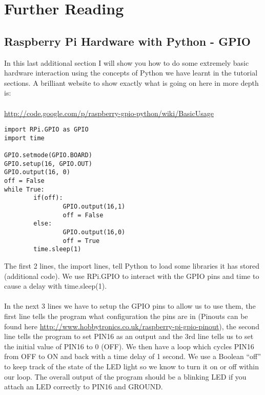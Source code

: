 \documentclass[twocolumn]{article}
\begin{document}
\section{Further Reading}

\subsection{Raspberry Pi Hardware with Python - GPIO}

In this last additional section I will show you how to do some extremely basic hardware interaction using the concepts of Python we have learnt in the tutorial sections. A brilliant website to show exactly what is going on here in more depth is:\\
\\ \url{http://code.google.com/p/raspberry-gpio-python/wiki/BasicUsage}
\begin{lstlisting}
import RPi.GPIO as GPIO
import time

GPIO.setmode(GPIO.BOARD)
GPIO.setup(16, GPIO.OUT)
GPIO.output(16, 0)
off = False
while True:
        if(off):
                GPIO.output(16,1)
                off = False
        else:
                GPIO.output(16,0)
                off = True
        time.sleep(1)
\end{lstlisting}
The first 2 lines, the import lines, tell Python to load some libraries it has stored (additional code). We use RPi.GPIO to interact with the GPIO pins and time to cause a delay with time.sleep(1).\\
\\
In the next 3 lines we have to setup the GPIO pins to allow us to use them, the first line tells the program what configuration the pins are in (Pinouts can be found here \url{http://www.hobbytronics.co.uk/raspberry-pi-gpio-pinout}), the second line tells the program to set PIN16 as an output and the 3rd line tells us to set the initial value of PIN16 to 0 (OFF). We then have a loop which cycles PIN16 from OFF to ON and back with a time delay of 1 second. We use a Boolean ``off'' to keep track of the state of the LED light so we know to turn it on or off within our loop. The overall output of the program should be a blinking LED if you attach an LED correctly to PIN16 and GROUND.
\end{document}
